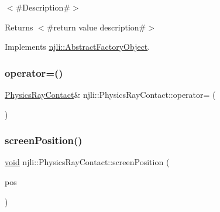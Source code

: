 $<$\#\+Description\#$>$

\begin{DoxyReturn}{Returns}
$<$\#return value description\#$>$ 
\end{DoxyReturn}


Implements \mbox{\hyperlink{classnjli_1_1_abstract_factory_object_a838f4fa7e65cace6098aab5222892942}{njli\+::\+Abstract\+Factory\+Object}}.

\mbox{\label{classnjli_1_1_physics_ray_contact_a02b26a7d8039cbf2b595f517bbfaa166}} 
\subsubsection{\texorpdfstring{operator=()}{operator=()}}
{\footnotesize\ttfamily \mbox{\hyperlink{classnjli_1_1_physics_ray_contact}{Physics\+Ray\+Contact}}\& njli\+::\+Physics\+Ray\+Contact\+::operator= (\begin{DoxyParamCaption}\item[{const \mbox{\hyperlink{classnjli_1_1_physics_ray_contact}{Physics\+Ray\+Contact}} \&}]{ }\end{DoxyParamCaption})\hspace{0.3cm}{\ttfamily [protected]}}

\mbox{\label{classnjli_1_1_physics_ray_contact_ae44f643d72f6feff01536b0514ea2cf9}} 
\subsubsection{\texorpdfstring{screen\+Position()}{screenPosition()}}
{\footnotesize\ttfamily \mbox{\hyperlink{_thread_8h_af1e856da2e658414cb2456cb6f7ebc66}{void}} njli\+::\+Physics\+Ray\+Contact\+::screen\+Position (\begin{DoxyParamCaption}\item[{const bt\+Vector2 \&}]{pos }\end{DoxyParamCaption})\hspace{0.3cm}{\ttfamily [protected]}}

